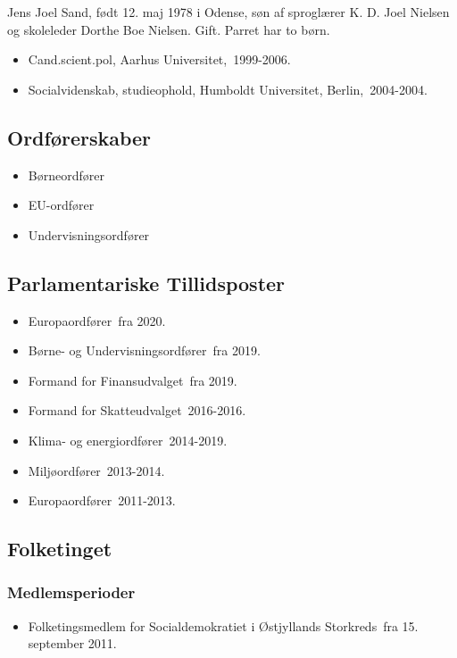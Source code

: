 \documentclass[11pt, a4paper]{awesome-cv}
\begin{document}
\makecvheader[R]
\makelettertitle
\begin{cvletter}
Jens Joel Sand, født 12. maj 1978 i Odense, søn af sproglærer K. D. Joel Nielsen og skoleleder Dorthe Boe Nielsen. Gift. Parret har to børn.

\begin{itemize}
\item Cand.scient.pol, Aarhus Universitet, 1999-2006.
\item Socialvidenskab, studieophold, Humboldt Universitet, Berlin, 2004-2004.
\end{itemize}
\subsection*{Ordførerskaber}
\begin{itemize}
\item Børneordfører
\item EU-ordfører
\item Undervisningsordfører
\end{itemize}
\subsection*{Parlamentariske Tillidsposter}
\begin{itemize}
\item Europaordfører fra 2020.
\item Børne- og Undervisningsordfører fra 2019.
\item Formand for Finansudvalget fra 2019.
\item Formand for Skatteudvalget 2016-2016.
\item Klima- og energiordfører 2014-2019.
\item Miljøordfører 2013-2014.
\item Europaordfører 2011-2013.
\end{itemize}
\subsection*{Folketinget}
\subsubsection*{Medlemsperioder}
\begin{itemize}
\item Folketingsmedlem for Socialdemokratiet i Østjyllands Storkreds fra 15. september 2011.
\end{itemize}

\end{cvletter}
\end{document}
